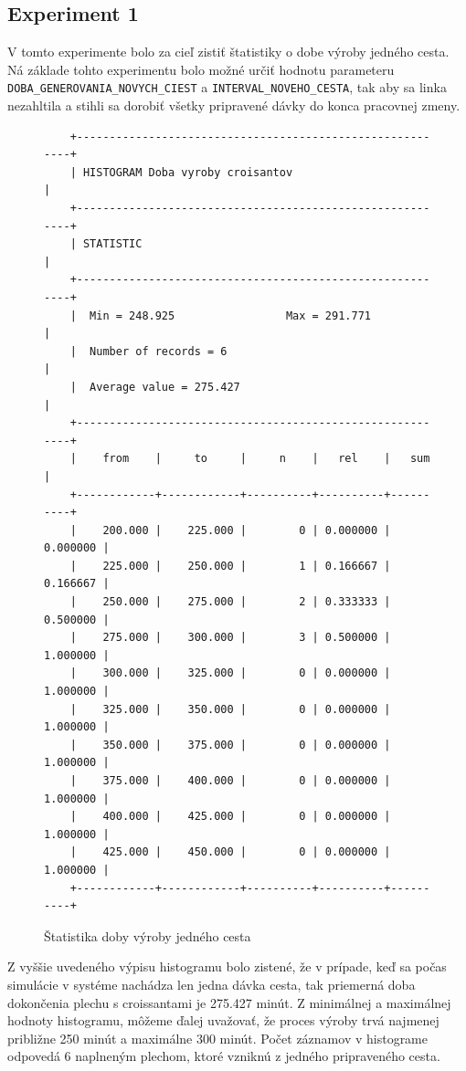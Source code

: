 \documentclass[11pt]{article}
\begin{document}
\subsection{Experiment 1}
\label{exp:one_dough_experiment}
V tomto experimente bolo za cieľ zistiť štatistiky o dobe výroby jedného cesta. Ná základe tohto experimentu bolo možné určiť hodnotu parameteru \texttt{DOBA\_GENEROVANIA\_NOVYCH\_CIEST}
a \texttt{INTERVAL\_NOVEHO\_CESTA}, tak aby sa linka nezahltila a stihli sa dorobiť všetky pripravené dávky do konca pracovnej zmeny. 

\begin{figure}[H]
\begin{verbatim}
    +----------------------------------------------------------+
    | HISTOGRAM Doba vyroby croisantov                         |
    +----------------------------------------------------------+
    | STATISTIC                                                |
    +----------------------------------------------------------+
    |  Min = 248.925                 Max = 291.771             |
    |  Number of records = 6                                   |
    |  Average value = 275.427                                 |
    +----------------------------------------------------------+
    |    from    |     to     |     n    |   rel    |   sum    |
    +------------+------------+----------+----------+----------+
    |    200.000 |    225.000 |        0 | 0.000000 | 0.000000 |
    |    225.000 |    250.000 |        1 | 0.166667 | 0.166667 |
    |    250.000 |    275.000 |        2 | 0.333333 | 0.500000 |
    |    275.000 |    300.000 |        3 | 0.500000 | 1.000000 |
    |    300.000 |    325.000 |        0 | 0.000000 | 1.000000 |
    |    325.000 |    350.000 |        0 | 0.000000 | 1.000000 |
    |    350.000 |    375.000 |        0 | 0.000000 | 1.000000 |
    |    375.000 |    400.000 |        0 | 0.000000 | 1.000000 |
    |    400.000 |    425.000 |        0 | 0.000000 | 1.000000 |
    |    425.000 |    450.000 |        0 | 0.000000 | 1.000000 |
    +------------+------------+----------+----------+----------+
\end{verbatim}
\caption{Štatistika doby výroby jedného cesta}
\label{fig:one_dough_experiment}
\end{figure}

Z vyššie uvedeného výpisu histogramu bolo zistené, že v prípade, keď sa počas simulácie v systéme nachádza len jedna dávka cesta, tak priemerná doba dokončenia plechu s croissantami je 275.427 minút. Z minimálnej a maximálnej hodnoty histogramu, môžeme ďalej uvažovať, že proces výroby trvá najmenej približne 250 minút a maximálne 300 minút. Počet záznamov v histograme 
odpovedá 6 naplneným plechom, ktoré vzniknú z jedného pripraveného cesta.
\end{document}
